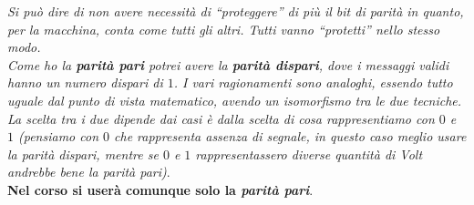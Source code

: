 \documentclass[a4paper,12pt, oneside]{book}
\begin{document}
\textit{Si può dire di non avere necessità di ``proteggere'' di più il bit di
  parità in quanto, per la macchina, conta come tutti gli altri. Tutti vanno
  ``protetti'' nello stesso modo.}\\
\textit{Come ho la \textbf{parità pari} potrei avere la \textbf{parità dispari},
dove i messaggi validi hanno un numero dispari di $1$. I vari ragionamenti sono
analoghi, essendo tutto uguale dal punto di vista matematico, avendo un
isomorfismo tra le due tecniche. La scelta tra i due dipende dai casi è dalla
scelta di cosa rappresentiamo con $0$ e $1$ (pensiamo con $0$ che rappresenta
assenza di segnale, in questo caso meglio usare la parità dispari, mentre se $0$
e $1$ rappresentassero diverse quantità di Volt andrebbe bene la parità
pari)}. \\ 
\textbf{Nel corso si userà comunque solo la \textit{parità pari}}.
\end{document}
